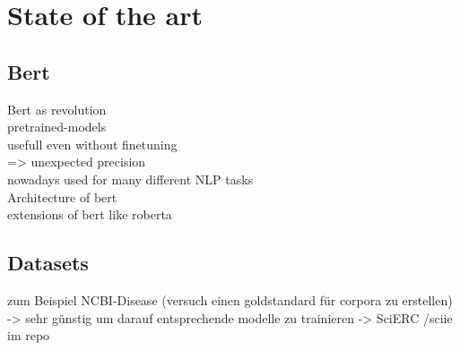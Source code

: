 \chapter{State of the art}
\section{Bert}
Bert as revolution\\
pretrained-models\\
usefull even without finetuning\\
=> unexpected precision\\

nowadays used for many different NLP tasks\\
Architecture of bert\\
extensions of bert like roberta\\
\section{Datasets}
zum Beispiel NCBI-Disease (versuch einen goldstandard für corpora zu erstellen)\\
-> sehr günstig um darauf entsprechende modelle zu trainieren \cite{Dogan2014}
-> SciERC /sciie im repo \cite{luan2018multitask}